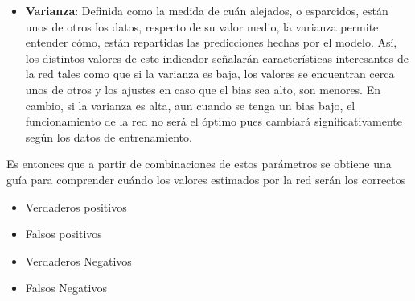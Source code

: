 \begin{itemize}
{\begin{enumerate}
\begin{enumerate}
{\begin{itemize}
                \item{\textbf{Varianza}: Definida como la medida de cuán alejados, o esparcidos, están unos de otros los datos, respecto de su valor medio, la varianza permite entender cómo, están repartidas las predicciones hechas por el modelo. Así, los distintos valores de este indicador señalarán características interesantes de la red tales como que si la varianza es baja, los valores se encuentran cerca unos de otros y los ajustes en caso que el bias sea alto, son menores. En cambio, si la varianza es alta, aun cuando se tenga un bias bajo, el funcionamiento de la red no será el óptimo pues cambiará significativamente según los datos de entrenamiento.\\}
            \end{itemize}
            
            Es entonces que a partir de combinaciones de estos parámetros se obtiene una guía para comprender cuándo los valores estimados por la red serán los correctos
            
            \begin{itemize}
                \item {Verdaderos positivos}
                \item {Falsos positivos}
                \item {Verdaderos Negativos}
                \item {Falsos Negativos}
            \end{itemize}
            }
            \end{enumerate}
        \end{enumerate}
            }
    \end{itemize}
    